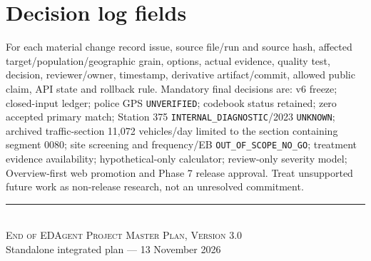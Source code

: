 \documentclass[11pt,a4paper,openany]{report}
\newcommand{\pathcode}[1]{\nolinkurl{#1}}
\begin{document}
\section{Decision log fields}
For each material change record issue, source file/run and source hash, affected target/population/geographic grain, options, actual evidence, quality test, decision, reviewer/owner, timestamp, derivative artifact/commit, allowed public claim, API state and rollback rule. Mandatory final decisions are: v6 freeze; closed-input ledger; police GPS \pathcode{UNVERIFIED}; codebook status retained; zero accepted primary match; Station 375 \pathcode{INTERNAL_DIAGNOSTIC}/2023 \pathcode{UNKNOWN}; archived traffic-section 11,072 vehicles/day limited to the section containing segment 0080; site screening and frequency/EB \pathcode{OUT_OF_SCOPE_NO_GO}; treatment evidence availability; hypothetical-only calculator; review-only severity model; Overview-first web promotion and Phase 7 release approval. Treat unsupported future work as non-release research, not an unresolved commitment.

\begin{center}
\rule{.62\linewidth}{.5pt}\\[5pt]
\textsc{End of EDAgent Project Master Plan, Version 3.0}\\[3pt]
\small Standalone integrated plan --- 13 November 2026
\end{center}
\end{document}
